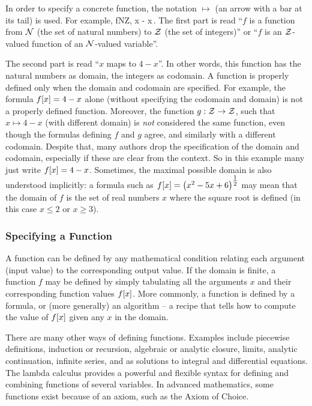 In order to specify a concrete function, the notation $\mapsto$ (an arrow with a bar at its tail) is used. For example, \beq
\fdef f{\set N}{\set Z}, x - x\,.
\eeq
The first part is read ``$f$ is a function from $\mathcal{N}$ (the set of natural numbers) to $\mathcal{Z}$ (the set of integers)'' or ``$f$ is an $\mathcal{Z}$-valued function of an $\mathcal{N}$-valued variable''.

The second part is read ``$x$ maps to $4 - x$''. In other words, this function has the natural numbers as domain, the integers as codomain. A function is properly defined only when the domain and codomain are specified. For example, the formula $f\!\left[{x}\right] = 4 - x$ alone (without specifying the codomain and domain) is not a properly defined function. Moreover, the function ${g}:{\mathcal{Z}}\to{\mathcal{Z}}$, such that $x\mapsto 4 - x$ (with different domain) is \emph{not} considered the same function, even though the formulas defining $f$ and $g$ agree, and similarly with a different codomain. Despite that, many authors drop the specification of the domain and codomain, especially if these are clear from the context. So in this example many just write $f\!\left[{x}\right] = 4 - x$. Sometimes, the maximal possible domain is also understood implicitly: a formula such as $f\!\left[{x}\right] = \left({x^2 - 5x + 6}\right)^{\tfrac{1}{2}}$ may mean that the domain of $f$ is the set of real numbers $x$ where the square root is defined (in this case $x\leq 2$ or $x\geq 3$).


\subsubsection{Specifying a Function}
A function can be defined by any mathematical condition relating each argument (input value) to the corresponding output value. If the domain is finite, a function $f$ may be defined by simply tabulating all the arguments $x$ and their corresponding function values $f\!\left[{x}\right]$. More commonly, a function is defined by a formula, or (more generally) an algorithm -- a recipe that tells how to compute the value of $f\!\left[{x}\right]$ given any $x$ in the domain.

There are many other ways of defining functions. Examples include piecewise definitions, induction or recursion, algebraic or analytic closure, limits, analytic continuation, infinite series, and as solutions to integral and differential equations. The lambda calculus provides a powerful and flexible syntax for defining and combining functions of several variables. In advanced mathematics, some functions exist because of an axiom, such as the Axiom of Choice.


